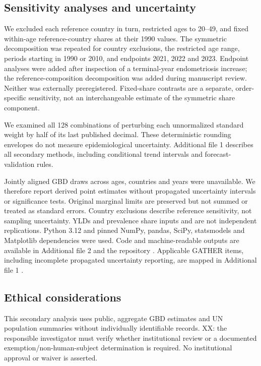 \documentclass[11pt,a4paper]{article}
\begin{document}

\subsection{Sensitivity analyses and uncertainty}
We excluded each reference country in turn, restricted ages to 20--49, and fixed within-age reference-country shares at their 1990 values. The symmetric decomposition was repeated for country exclusions, the restricted age range, periods starting in 1990 or 2010, and endpoints 2021, 2022 and 2023. Endpoint analyses were added after inspection of a terminal-year endometriosis increase; the reference-composition decomposition was added during manuscript review. Neither was externally preregistered. Fixed-share contrasts are a separate, order-specific sensitivity, not an interchangeable estimate of the symmetric share component.



We examined all 128 combinations of perturbing each unnormalized standard weight by half of its last published decimal. These deterministic rounding envelopes do not measure epidemiological uncertainty. Additional file 1 describes all secondary methods, including conditional trend intervals and forecast-validation rules.

Jointly aligned GBD draws across ages, countries and years were unavailable. We therefore report derived point estimates without propagated uncertainty intervals or significance tests. Original marginal limits are preserved but not summed or treated as standard errors. Country exclusions describe reference sensitivity, not sampling uncertainty. YLDs and prevalence share inputs and are not independent replications. Python 3.12 and pinned NumPy, pandas, SciPy, statsmodels and Matplotlib dependencies were used. Code and machine-readable outputs are available in Additional file 2 and the repository \cite{repository}. Applicable GATHER items, including incomplete propagated uncertainty reporting, are mapped in Additional file 1 \cite{gather}.

\subsection{Ethical considerations}
This secondary analysis uses public, aggregate GBD estimates and UN population summaries without individually identifiable records. XX: the responsible investigator must verify whether institutional review or a documented exemption/non-human-subject determination is required. No institutional approval or waiver is asserted.
\end{document}
